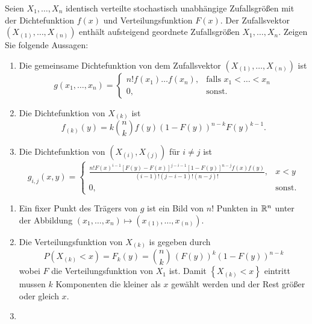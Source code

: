  Seien $X_1,\dots ,X_n$
identisch verteilte stochastisch unabhängige Zufallsgrößen mit der
Dichtefunktion $f(x)$ und Verteilungsfunktion $F(x)$. Der Zufallsvektor $\left(
X_{(1)},\dots ,X_{(n)} \right)$ enthält aufsteigend geordnete Zufallsgrößen
$X_1,\dots ,X_n$. Zeigen Sie folgende Aussagen:
\begin{enumerate}
    \item Die gemeinsame Dichtefunktion von dem Zufallsvektor $\left( X_{(1)},\dots ,X_{(n)} \right)$
        ist
        \begin{equation*}
            g(x_{1},\dots ,x_n) = \begin{cases}
                n! f(x_1)\dots f(x_n), & \text{falls } x_{1} < \dots < x_n \\
                0, & \text{sonst.}
            \end{cases}
        \end{equation*}

    \item Die Dichtefunktion von $X_{(k)}$ ist
        \begin{equation*}
            f_{(k)}(y) = k \binom{n}{k} f(y) (1-F(y))^{n-k} F(y)^{k-1}.
        \end{equation*}

    \item Die Dichtefunktion von $(X_{(i)},X_{(j)})$ für $i\neq j$ ist
        \begin{equation*}
            g_{i,j}(x,y)= \begin{cases}
                \frac{n! F(x)^{i-1} [F(y)-F(x)]^{j-i-1} [1-F(y)]^{n-j}f(x)f(y) }{ (i-1)! (j-i-1)! (n-j)! }, & x<y \\
                0, & \text{sonst.}
            \end{cases}
        \end{equation*}
\end{enumerate}

\solution
\begin{enumerate}
    \item Ein fixer Punkt des Trägers von $g$ ist ein Bild von $n!$ Punkten in
        $\mathbb R^n$ unter der Abbildung $(x_1,\dots ,x_n)\mapsto (x_{(1)},\dots
        ,x_{(n)})$.
    \item Die Verteilungsfunktion von $X_{(k)}$ is gegeben durch
        \begin{equation*}
            P(X_{(k)} < x) = F_{k}(y) = \binom{n}{k}\, (F(y))^{k} \left( 1-F(y)  \right)^{n-k}
        \end{equation*}
        wobei $F$ die Verteilungsfunktion von $X_1$ ist. Damit $\left\{ X_{
        (k)} < x \right\}$ eintritt mussen $k$ Komponenten die kleiner als $x$
        gewählt werden und der Rest größer oder gleich $x$. 
    \item 
\end{enumerate}



